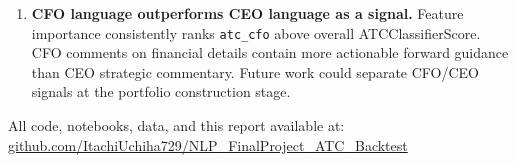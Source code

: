 \documentclass[11pt,a4paper]{article}
\begin{document}
\begin{enumerate}[leftmargin=*]
  \item \textbf{CFO language outperforms CEO language as a signal.} Feature importance consistently ranks \texttt{atc\_cfo} above overall ATCClassifierScore. CFO comments on financial details contain more actionable forward guidance than CEO strategic commentary. Future work could separate CFO/CEO signals at the portfolio construction stage.
\end{enumerate}

\vfill
\begin{center}
{\small All code, notebooks, data, and this report available at:\\
\href{https://github.com/ItachiUchiha729/NLP_FinalProject_ATC_Backtest}%
{github.com/ItachiUchiha729/NLP\_FinalProject\_ATC\_Backtest}}
\end{center}
\end{document}
